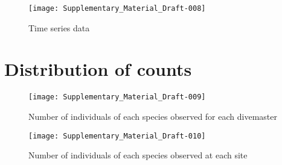 \documentclass[a4paper]{article}
\begin{document}

\begin{figure}[h!]
\centering
\texttt{[image: Supplementary\_Material\_Draft-008]}
\caption{Time series data}
\end{figure}





\clearpage



\section{Distribution of counts}


\begin{figure}[h!]
\centering
\texttt{[image: Supplementary\_Material\_Draft-009]}
\caption{Number of individuals of each species observed for each divemaster}
\end{figure}



\begin{figure}[h!]
\centering
\texttt{[image: Supplementary\_Material\_Draft-010]}
\caption{Number of individuals of each species observed at each site}
\end{figure}



\clearpage

\end{document}
